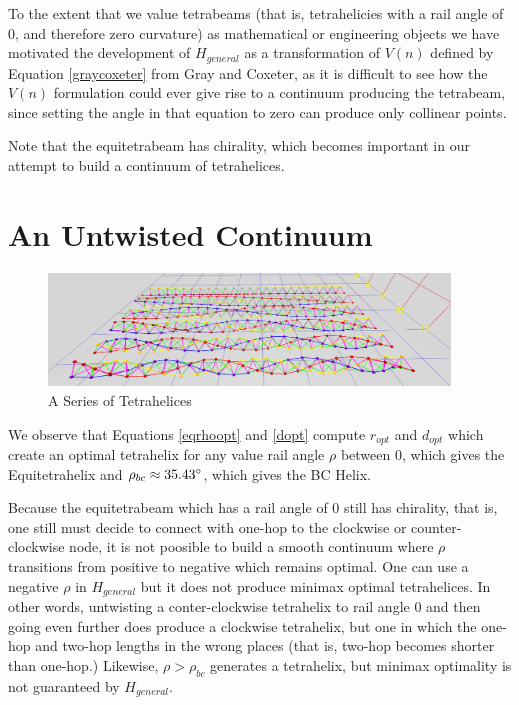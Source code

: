 \documentclass[11pt]{article}
\begin{document}
To the extent that we value tetrabeams (that is, tetrahelicies with a rail angle of $0$,
and therefore zero curvature) as mathematical or engineering objects
we have motivated the development of $H_{general}$ as a transformation of $V(n)$ defined by
Equation \eqref{graycoxeter} from Gray and Coxeter, as it is difficult to see how
the $V(n)$ 
formulation could ever give rise to a continuum producing the tetrabeam,
since setting the angle in that equation to zero can produce only collinear points.

Note that the equitetrabeam has chirality, which becomes important in our attempt to build a
continuum of tetrahelices.

\section{An Untwisted Continuum}

\begin{figure}[H]
  \label{fig:spudboy}
  \centering
     \includegraphics[width=0.95\textwidth]{figures/TetrahelixSeries.png}
     \caption{A Series of Tetrahelices}
\end{figure}

We observe that Equations \eqref{eqrhoopt} and \eqref{dopt} compute $r_{opt}$ and $d_{opt}$ which
create an optimal tetrahelix for any value rail angle $\rho$ between $0$, which
gives the Equitetrahelix and
$\rho_{bc} \approx 35.43 \degree$, which gives the BC Helix.

 Because the equitetrabeam which has a rail angle of $0$ still has
 chirality, that is, one still must decide to connect with one-hop to
 the clockwise or counter-clockwise node, it is not poosible to build
 a smooth continuum where $\rho$ transitions from positive to negative
 which remains optimal. One can use a negative $\rho$ in $H_{general}$
 but it does not produce minimax optimal tetrahelices. In other words,
 untwisting a conter-clockwise tetrahelix to rail angle $0$ and then going
even further does produce a clockwise tetrahelix, but one in which the
 one-hop and two-hop lengths in the wrong places (that is, two-hop
 becomes shorter than one-hop.) Likewise, $\rho > \rho_{bc}$ generates
 a tetrahelix, but minimax optimality is not guaranteed by $H_{general}$.
 
\end{document}

